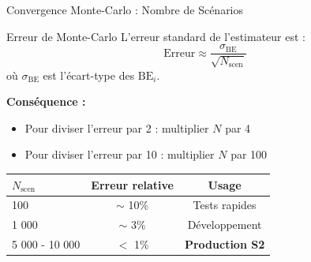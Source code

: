 \documentclass[10pt,aspectratio=169,xcolor={dvipsnames}]{beamer}
\newcommand{\BE}{\text{BE}}
\begin{document}
\begin{frame}{Convergence Monte-Carlo : Nombre de Scénarios}
\begin{block}{Erreur de Monte-Carlo}
L'erreur standard de l'estimateur est :
\[
\text{Erreur} \approx \frac{\sigma_{\BE}}{\sqrt{N_{\text{scen}}}}
\]
où $\sigma_{\BE}$ est l'écart-type des $\BE_i$.
\end{block}

\textbf{Conséquence :}
\begin{itemize}
    \item Pour diviser l'erreur par 2 : multiplier $N$ par 4
    \item Pour diviser l'erreur par 10 : multiplier $N$ par 100
\end{itemize}

\vspace{0.3cm}
\begin{table}
\centering
\begin{tabular}{lcc}
\toprule
\textbf{$N_{\text{scen}}$} & \textbf{Erreur relative} & \textbf{Usage} \\
\midrule
100 & $\sim$ 10\% & Tests rapides \\
1 000 & $\sim$ 3\% & Développement \\
\rowcolor{green!20}
5 000 - 10 000 & $<$ 1\% & \textbf{Production S2} \\
\bottomrule
\end{tabular}
\end{table}
\end{frame}
\end{document}
